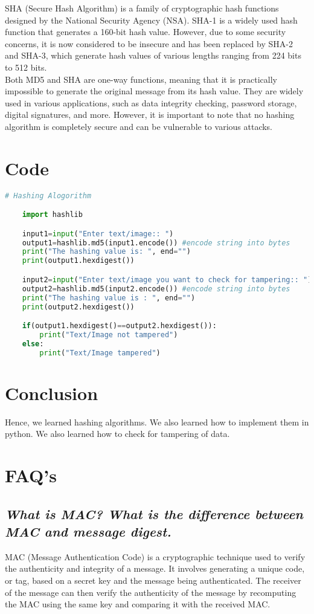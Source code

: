 \documentclass{article}
\begin{document}
SHA (Secure Hash Algorithm) is a family of cryptographic hash functions designed by the National Security Agency (NSA). SHA-1 is a widely used hash function that generates a 160-bit hash value. However, due to some security concerns, it is now considered to be insecure and has been replaced by SHA-2 and SHA-3, which generate hash values of various lengths ranging from 224 bits to 512 bits.\\

Both MD5 and SHA are one-way functions, meaning that it is practically impossible to generate the original message from its hash value. They are widely used in various applications, such as data integrity checking, password storage, digital signatures, and more. However, it is important to note that no hashing algorithm is completely secure and can be vulnerable to various attacks.
\section{\textbf{Code}}
\begin{lstlisting}[language=Python]
	# Hashing Alogorithm

	import hashlib

	input1=input("Enter text/image:: ")
	output1=hashlib.md5(input1.encode()) #encode string into bytes
	print("The hashing value is: ", end="")
	print(output1.hexdigest())

	input2=input("Enter text/image you want to check for tampering:: ")
	output2=hashlib.md5(input2.encode()) #encode string into bytes
	print("The hashing value is : ", end="")
	print(output2.hexdigest())

	if(output1.hexdigest()==output2.hexdigest()):
		print("Text/Image not tampered")
	else:
		print("Text/Image tampered")
\end{lstlisting}
\section{\textbf{Conclusion}}
Hence, we learned hashing algorithms. We also learned how to implement them in python. We also learned how to check for tampering of data.
\section{\textbf{FAQ's}}
\subsection{\textit{What is MAC? What is the difference between MAC and message digest.}}
MAC (Message Authentication Code) is a cryptographic technique used to verify the authenticity and integrity of a message. It involves generating a unique code, or tag, based on a secret key and the message being authenticated. The receiver of the message can then verify the authenticity of the message by recomputing the MAC using the same key and comparing it with the received MAC.\\
\end{document}
